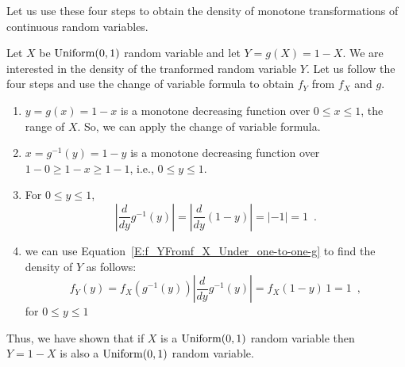 Let us use these four steps to obtain the density of monotone transformations of continuous random variables.

\begin{example}\label{Ex:1-UisU}
Let $X$ be $\mbox{{\rm Uniform}}(0,1)$ random variable and let $Y=g(X)=1-X$.  
We are interested in the density of the tranformed random variable $Y$. Let us follow the four steps and use the change of variable formula to obtain $f_Y$ from $f_X$ and $g$.
\begin{enumerate}
\item $y=g(x)=1-x$ is a monotone decreasing function over $0 \leq x \leq 1$, the range of $X$.  
So, we can apply the change of variable formula. 
\item $x=g^{-1}(y)=1-y$ is a monotone decreasing function over $1-0 \geq 1-x \geq 1-1$, i.e., $0 \leq y \leq 1$.  
\item For $0 \leq y \leq 1$,
\[
 \left\vert \frac{d}{dy} g^{-1}(y) \right\vert 
= \left\vert \frac{d}{dy} \left( 1-y \right) \right\vert 
= \left\vert -1 \right\vert = 1 \enspace .
\]
\item we can use Equation~\eqref{E:f_YFromf_X_Under_one-to-one-g} to find the density of $Y$ as follows:
\[
f_Y(y) = f_X \left( g^{-1}(y) \right) \left\vert \frac{d}{dy} g^{-1}(y) \right\vert 
= f_X \left( 1-y \right)  \, 1
= 1 \enspace ,
\]
for $0 \leq y \leq 1$
\end{enumerate}
Thus, we have shown that if $X$ is a $\mbox{{\rm Uniform}}(0,1)$ random variable then $Y=1-X$ is also a $\mbox{{\rm Uniform}}(0,1)$ random variable.
\end{example}


